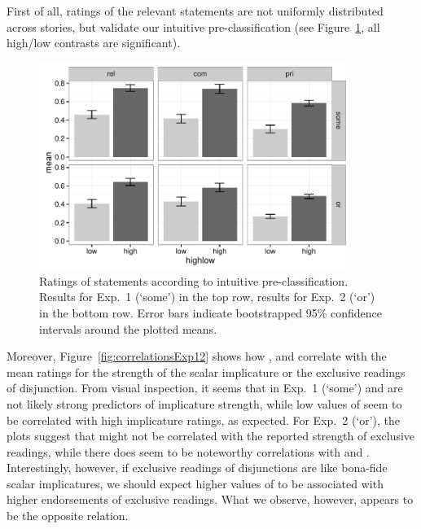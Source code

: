 \documentclass[12pt]{article}
\begin{document}
First of all, ratings of the relevant statements are not uniformly
distributed across stories, but validate our intuitive pre-classification (see
Figure~\ref{fig:EFbars12}, all high/low contrasts are significant).
%
\begin{figure}
  \centering

  \includegraphics[width = 0.9\textwidth]{pics_02/EFbarsExp12.pdf}
  
  \caption{Ratings of statements according to intuitive pre-classification. Results for
    Exp.~1 (`some') in the top row, results for Exp.~2 (`or') in the bottom
    row. Error bars indicate bootstrapped 95\% confidence intervals around the plotted means.}
  \label{fig:EFbars12}
\end{figure}
%
Moreover, Figure~\ref{fig:correlationsExp12} shows how \rel, \com and \pri correlate with the
mean ratings for the strength of the scalar implicature or the exclusive readings of
disjunction. From visual inspection, it seems that in Exp.~1 (`some') \rel and \com are not
likely strong predictors of implicature strength, while low values of \pri seem to be
correlated with high implicature ratings, as expected. For Exp.~2 (`or'), the plots suggest
that \rel might not be correlated with the reported strength of exclusive readings, while there
does seem to be noteworthy correlations with \com and \pri. Interestingly, however, if
exclusive readings of disjunctions are like bona-fide scalar implicatures, we should expect
higher values of \com to be associated with higher endorsements of exclusive
readings. What we observe, however, appears to be the opposite relation.
\end{document}
